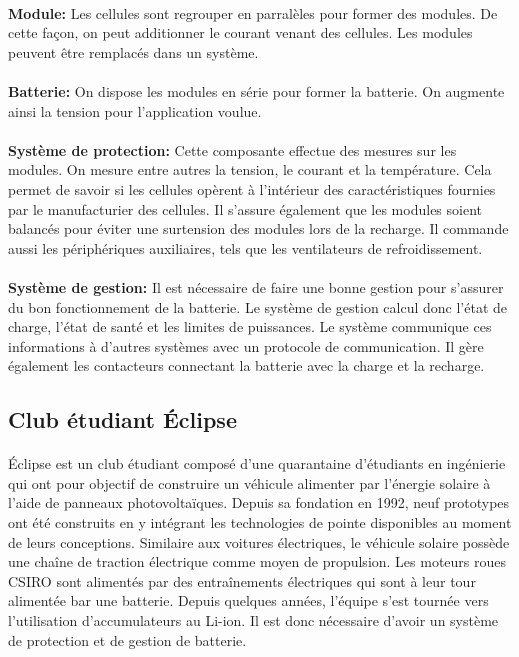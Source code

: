 		\paragraph{}
		\textbf{Module:} Les cellules sont regrouper en parralèles pour former des modules. De cette façon, on peut additionner le courant venant des cellules. Les modules peuvent être remplacés dans un système.
		
		\paragraph{}
		\textbf{Batterie:} On dispose les modules en série pour former la batterie. On augmente ainsi la tension pour l'application voulue.
		
		\paragraph{}
		\textbf{Système de protection:} Cette composante effectue des mesures sur les modules. On mesure entre autres la tension, le courant et la température. Cela permet de savoir si les cellules opèrent à l'intérieur des caractéristiques fournies par le manufacturier des cellules. Il s'assure également que les modules soient balancés pour éviter une surtension des modules lors de la recharge. Il commande aussi les périphériques auxiliaires, tels que les ventilateurs de refroidissement.
					
		\paragraph{}
		\textbf{Système de gestion:} Il est nécessaire de faire une bonne gestion pour s'assurer du bon fonctionnement de la batterie. Le système de gestion calcul donc l'état de charge, l'état de santé et les limites de puissances. Le système communique ces informations à d'autres systèmes avec un protocole de communication. Il gère également les contacteurs connectant la batterie avec la charge et la recharge.
			
		
	\subsection{Club étudiant Éclipse}
		
		\paragraph{}
		Éclipse est un club étudiant composé d'une quarantaine d'étudiants en ingénierie qui ont pour objectif de construire un véhicule alimenter par l'énergie solaire à l'aide de panneaux photovoltaïques. Depuis sa fondation en 1992, neuf prototypes ont été construits en y intégrant les technologies de pointe disponibles au moment de leurs conceptions. Similaire aux voitures électriques, le véhicule solaire possède une chaîne de traction électrique comme moyen de propulsion. Les moteurs roues  CSIRO sont alimentés par des entraînements électriques qui sont à leur tour alimentée bar une batterie. Depuis quelques années, l'équipe s'est tournée vers l'utilisation d'accumulateurs au Li-ion. Il est donc nécessaire d'avoir un système de protection et de gestion de batterie.
		
